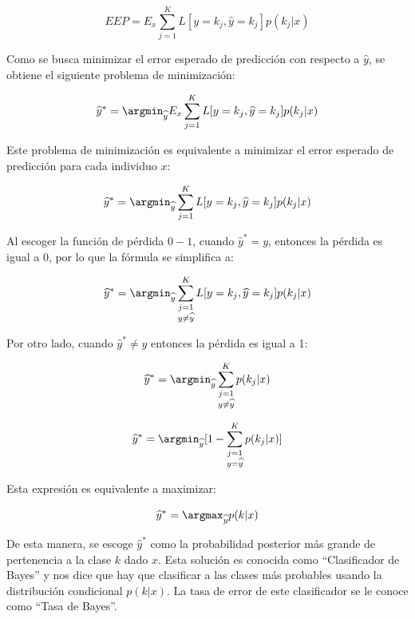 $$EEP = E_{x} \sum_{j=1}^{K} L[y = k_j, \widehat{y} = k_j] p(k_j | x)$$

Como se busca minimizar el error esperado de predicción con respecto a $\widehat{y}$, se obtiene el siguiente problema de minimización:

$$\widehat{y}^{*} = \argmin_{\widehat{y}} E_{x} \sum_{j=1}^{K} L[y = k_j, \widehat{y} = k_j] p(k_j | x)$$

Este problema de minimización es equivalente a minimizar el error esperado de predicción para cada individuo $x$:

$$\widehat{y}^{*} = \argmin_{\widehat{y}} \sum_{j=1}^K L[y = k_j, \widehat{y} = k_j]p(k_j|x)$$

Al escoger la función de pérdida $0-1$, cuando $\widehat{y}^{*} = y$, entonces la pérdida es igual a 0, por lo que la fórmula se simplifica a:

$$\widehat{y}^{*} = \argmin_{\widehat{y}}
\sum_{\substack{j = 1 \\
			   y \neq \widehat{y}}} ^ K 
			   L[y = k_j, \widehat{y} = k_j] p(k_j | x)$$

Por otro lado, cuando $\widehat{y}^{*} \neq y$ entonces la pérdida es igual a 1:

$$\widehat{y}^{*} = \argmin_{\widehat{y}}
\sum_{\substack{j=1 \\
      y \neq \widehat{y}}}^K
p(k_j | x)$$

$$\widehat{y}^{*} = \argmin_{\widehat{y}} 
[1 - \sum_{\substack{j=1 \\
      y = \widehat{y}}}^K
p(k_j|x)]$$

Esta expresión es equivalente a maximizar:

$$\widehat{y}^{*} = \argmax_{\widehat{y}} p(k|x)$$

De esta manera, se escoge $\widehat{y}^{*}$ como la probabilidad posterior más grande de pertenencia a la clase $k$ dado $x$. Esta solución es conocida como ``Clasificador de Bayes'' y nos dice que hay que clasificar a las clases más probables usando la distribución condicional $p(k|x)$. La tasa de error de este clasificador se le conoce como ``Tasa de Bayes''\cite{hastie2009elements}.



